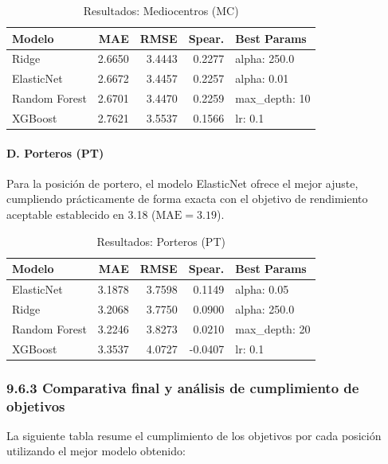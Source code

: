 \begin{table}[H]
\centering
\small
\begin{tabular}{|l|r|r|r|p{3cm}|}
\hline
\textbf{Modelo} & \textbf{MAE} & \textbf{RMSE} & \textbf{Spear.} & 
\textbf{Best Params} \\
\hline
Ridge & 2.6650 & 3.4443 & 0.2277 & alpha: 250.0 \\
ElasticNet & 2.6672 & 3.4457 & 0.2257 & alpha: 0.01 \\
Random Forest & 2.6701 & 3.4470 & 0.2259 & max\_depth: 10 \\
XGBoost & 2.7621 & 3.5537 & 0.1566 & lr: 0.1 \\
\hline
\end{tabular}
\caption{Resultados: Mediocentros (MC)}
\end{table}


\paragraph{D. Porteros (PT)}

Para la posición de portero, el modelo ElasticNet ofrece el mejor 
ajuste, cumpliendo prácticamente de forma exacta con el objetivo 
de rendimiento aceptable establecido en 3.18 
($\text{MAE} = 3.19$).

\begin{table}[H]
\centering
\small
\begin{tabular}{|l|r|r|r|p{3cm}|}
\hline
\textbf{Modelo} & \textbf{MAE} & \textbf{RMSE} & \textbf{Spear.} & 
\textbf{Best Params} \\
\hline
ElasticNet & 3.1878 & 3.7598 & 0.1149 & alpha: 0.05 \\
Ridge & 3.2068 & 3.7750 & 0.0900 & alpha: 250.0 \\
Random Forest & 3.2246 & 3.8273 & 0.0210 & max\_depth: 20 \\
XGBoost & 3.3537 & 4.0727 & -0.0407 & lr: 0.1 \\
\hline
\end{tabular}
\caption{Resultados: Porteros (PT)}
\end{table}


\subsubsection{9.6.3 Comparativa final y análisis de cumplimiento de objetivos}

La siguiente tabla resume el cumplimiento de los objetivos por 
cada posición utilizando el mejor modelo obtenido:

